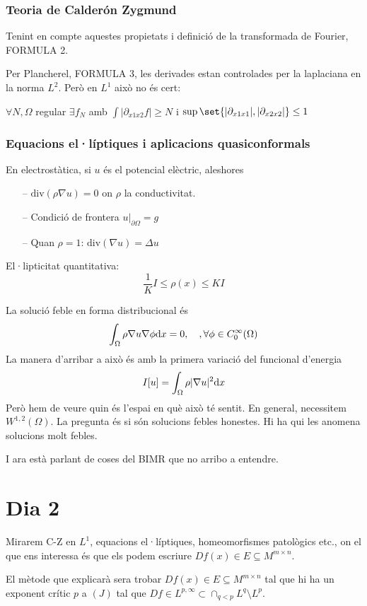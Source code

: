 \subsubsection{Teoria de Calderón Zygmund}
Tenint en compte aquestes propietats i definició de la transformada de Fourier, FORMULA 2.

Per Plancherel, FORMULA 3, les derivades estan controlades per la laplaciana en la norma $L^2$. Però en $L^1$ això no és cert:
\begin{teo}\label{teo:primer}
    $\forall N,\Omega$ regular $\exists f_N$ amb $\int|\partial_{x1x2}f|\ge N$ i $\sup\set{|\partial_{x1x1}|,|\partial_{x2x2}|}\le 1$
\end{teo}

\subsubsection{Equacions el·líptiques i aplicacions quasiconformals}
En electrostàtica, si $u$ és el potencial elèctric, aleshores 
\begin{itemize}
    \item[--] $\text{div}(\rho\nabla u) = 0$ on $\rho$ la conductivitat.
    \item[--] Condició de frontera $u|_{\partial\Omega} = g$
    \item[--] Quan $\rho = 1$: $\text{div}(\nabla u) = \Delta u$
\end{itemize}
El·lipticitat quantitativa:
$$\frac1KI\le\rho(x)\le KI$$

La solució feble en forma distribucional és $$\int_\Omega\rho\nabla u \nabla \phi \text dx = 0,\quad,\forall\phi\in C_0^\infty(\Omega)$$
La manera d'arribar a això és amb la primera variació del funcional d'energia
$$I[u] = \int_\Omega\rho|\nabla u|^2\text dx$$
Però hem de veure quin és l'espai en què això té sentit. En general, necessitem $W^{1,2}(\Omega)$. La pregunta és si són solucions febles honestes. Hi ha qui les anomena solucions molt febles. 

I ara està parlant de coses del BIMR que no arribo a entendre. 

\section{Dia 2}
Mirarem C-Z en $L^1$, equacions el·líptiques, homeomorfismes patològics etc., on el que ens interessa és que els podem escriure $Df(x)\in E\subseteq M^{m\times n}$. 

El mètode que explicarà sera trobar $Df(x)\in E\subseteq M^{m\times n}$ tal que hi ha un exponent crític $p$ a $(J)$ tal que $Df\in L^{p,\infty}\subset\cap_{q<p}L^q\setminus L^p$.

